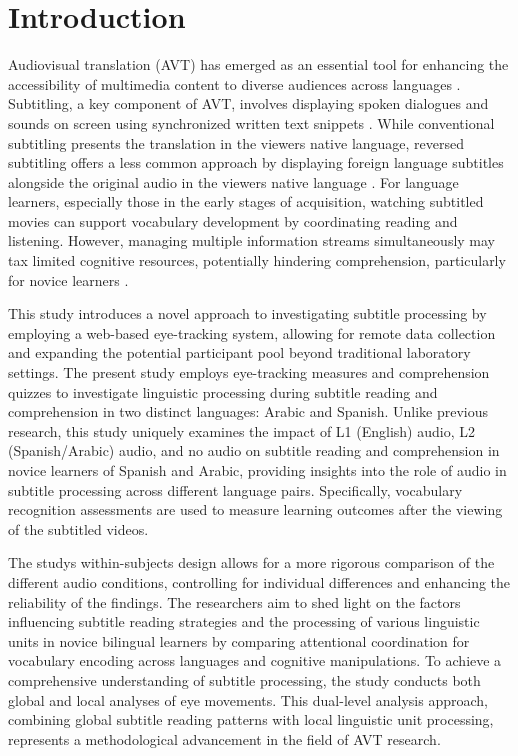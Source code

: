 \section{Introduction}\label{sec-introduction}

Audiovisual translation (AVT) has emerged as an essential tool for
enhancing the accessibility of multimedia content to diverse audiences
across languages \cite{díaz-cintas2023}. Subtitling, a key
component of AVT, involves displaying spoken dialogues and sounds on
screen using synchronized written text snippets \cite{fernández-costales2023}. While conventional subtitling presents the translation in
the viewer\textquotesingle s native language, reversed subtitling offers
a less common approach by displaying foreign language subtitles
alongside the original audio in the viewer\textquotesingle s native
language \cite{bolaños2023}. For language
learners, especially those in the early stages of acquisition, watching
subtitled movies can support vocabulary development by coordinating
reading and listening. However, managing multiple information streams
simultaneously may tax limited cognitive resources, potentially
hindering comprehension, particularly for novice learners \cite{hornerocorisco2023}.

This study introduces a novel approach to investigating subtitle
processing by employing a web-based eye-tracking system, allowing for
remote data collection and expanding the potential participant pool
beyond traditional laboratory settings. The present study employs
eye-tracking measures and comprehension quizzes to investigate
linguistic processing during subtitle reading and comprehension in two
distinct languages: Arabic and Spanish. Unlike previous research, this
study uniquely examines the impact of L1 (English) audio, L2
(Spanish/Arabic) audio, and no audio on subtitle reading and
comprehension in novice learners of Spanish and Arabic, providing
insights into the role of audio in subtitle processing across different
language pairs. Specifically, vocabulary recognition assessments are
used to measure learning outcomes after the viewing of the subtitled
videos.


  The study\textquotesingle s within-subjects design allows for a more
  rigorous comparison of the different audio conditions, controlling for
  individual differences and enhancing the reliability of the findings.
  The researchers aim to shed light on the factors influencing subtitle
  reading strategies and the processing of various linguistic units in
  novice bilingual learners by comparing attentional coordination for
  vocabulary encoding across languages and cognitive manipulations. To
  achieve a comprehensive understanding of subtitle processing, the
  study conducts both global and local analyses of eye movements. This
  dual-level analysis approach, combining global subtitle reading
  patterns with local linguistic unit processing, represents a
  methodological advancement in the field of AVT research.

